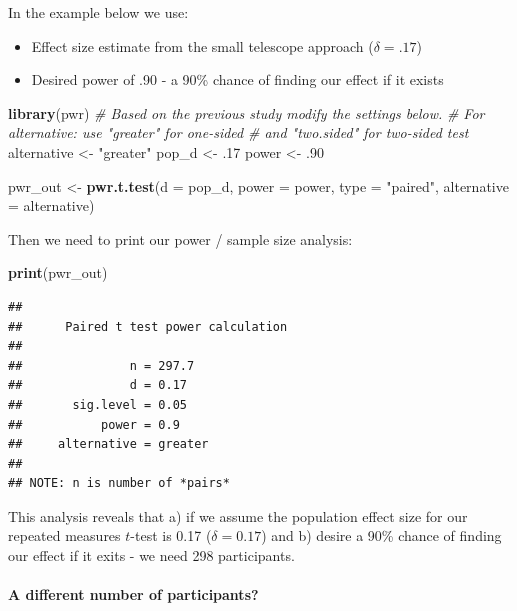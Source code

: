 \documentclass[
]{krantz}
\makeatletter
\newenvironment{Shaded}{\begin{snugshade}}{\end{snugshade}}
\newcommand{\CommentTok}[1]{\textcolor[rgb]{0.37,0.37,0.37}{\textit{#1}}}
\newcommand{\DataTypeTok}[1]{\textcolor[rgb]{0.27,0.27,0.27}{#1}}
\newcommand{\FloatTok}[1]{\textcolor[rgb]{0.06,0.06,0.06}{#1}}
\newcommand{\KeywordTok}[1]{\textcolor[rgb]{0.27,0.27,0.27}{\textbf{#1}}}
\newcommand{\NormalTok}[1]{#1}
\newcommand{\StringTok}[1]{\textcolor[rgb]{0.5,0.5,0.5}{#1}}
\newenvironment{kframe}{%
\medskip{}
\setlength{\fboxsep}{.8em}
 \def\at@end@of@kframe{}%
 \ifinner\ifhmode%
  \def\at@end@of@kframe{\end{minipage}}%
  \begin{minipage}{\columnwidth}%
 \fi\fi%
 \def\FrameCommand##1{\hskip\@totalleftmargin \hskip-\fboxsep
 \colorbox{shadecolor}{##1}\hskip-\fboxsep
     \hskip-\linewidth \hskip-\@totalleftmargin \hskip\columnwidth}%
 \MakeFramed {\advance\hsize-\width
   \@totalleftmargin\z@ \linewidth\hsize
   \@setminipage}}%
 {\par\unskip\endMakeFramed%
 \at@end@of@kframe}
\renewenvironment{Shaded}{\begin{kframe}}{\end{kframe}}
\makeatother
\begin{document}
In the example below we use:

\begin{itemize}
\item
  Effect size estimate from the small telescope approach (\(\delta = .17\))
\item
  Desired power of .90 - a 90\% chance of finding our effect if it exists
\end{itemize}

\begin{Shaded}
\begin{Highlighting}[]
\KeywordTok{library}\NormalTok{(pwr)}
\CommentTok{# Based on the previous study modify the settings below.}
\CommentTok{# For alternative: use "greater" for one-sided }
\CommentTok{# and "two.sided" for two-sided test}
\NormalTok{alternative <-}\StringTok{ "greater"}
\NormalTok{pop_d <-}\StringTok{ }\FloatTok{.17}
\NormalTok{power <-}\StringTok{ }\FloatTok{.90}

\NormalTok{pwr_out <-}\StringTok{ }\KeywordTok{pwr.t.test}\NormalTok{(}\DataTypeTok{d =}\NormalTok{ pop_d, }
                      \DataTypeTok{power =}\NormalTok{ power,}
                      \DataTypeTok{type =} \StringTok{"paired"}\NormalTok{,}
                      \DataTypeTok{alternative =}\NormalTok{ alternative)}
\end{Highlighting}
\end{Shaded}

Then we need to print our power / sample size analysis:

\begin{Shaded}
\begin{Highlighting}[]
\KeywordTok{print}\NormalTok{(pwr_out)}
\end{Highlighting}
\end{Shaded}

\begin{verbatim}
## 
##      Paired t test power calculation 
## 
##               n = 297.7
##               d = 0.17
##       sig.level = 0.05
##           power = 0.9
##     alternative = greater
## 
## NOTE: n is number of *pairs*
\end{verbatim}

This analysis reveals that a) if we assume the population effect size for our repeated measures \(t\)-test is 0.17 (\(\delta = 0.17\)) and b) desire a 90\% chance of finding our effect if it exits - we need 298 participants.

\hypertarget{a-different-number-of-participants-1}{%
\paragraph{A different number of participants?}\label{a-different-number-of-participants-1}}
\end{document}
